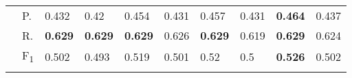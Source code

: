 \begin{tabularx}{\textwidth}{p{1.3em}l Z  Z  Z  Z  Z  Z  Z  Z }
    & P.    & 0.432    & 0.42    & 0.454    & 0.431    & 0.457    & 0.431    & \textbf{ 0.464 }    & 0.437 \\
    & R.    & \textbf{ 0.629 }    & \textbf{ 0.629 }    & \textbf{ 0.629 }    & 0.626    & \textbf{ 0.629 }    & 0.619    & \textbf{ 0.629 }    & 0.624 \\
    & F\textsubscript{1}    & 0.502    & 0.493    & 0.519    & 0.501    & 0.52    & 0.5    & \textbf{ 0.526 }    & 0.502 \\
     \midrule {}

\end{tabularx}